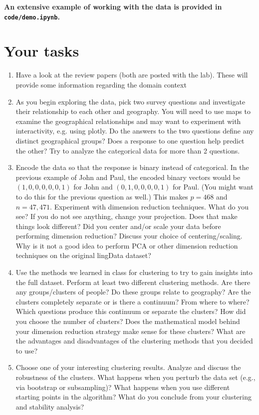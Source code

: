 \documentclass[letterpaper,12pt]{article}
\begin{document}
\textbf{An extensive example of working with the data is provided in \texttt{code/demo.ipynb}.}

\section{Your tasks}

\begin{enumerate}
    \item  Have a look at the review papers \cite{nerbonne2003introducing,nerbonne2006progress} (both are posted with the lab). These will provide some information regarding the domain context
    \item As you begin exploring the data, pick two survey questions and investigate their relationship to each other and geography. You will need to use maps to examine the geographical relationships and may want to experiment with interactivity, e.g. using plotly. Do the answers to the two questions define any distinct geographical groups? Does a response to one question help predict the other? Try to analyze the categorical data for more than 2 questions.
    \item Encode the data so that the response is binary instead of categorical. In the previous example of John and Paul, the encoded binary vectors would be $(1, 0, 0, 0, 0, 0, 1)$ for John and $(0, 1, 0, 0, 0, 0, 1)$ for Paul. (You might want to do this for the previous question as well.) This makes $p = 468$ and $n = 47,471$. Experiment with dimension reduction techniques. What do you see? If you do not see anything, change your projection. Does that make things look different? Did you center and/or scale your data before performing dimension reduction? Discuss your choice of centering/scaling. Why is it not a good idea to perform PCA or other dimension reduction techniques on the original lingData dataset?
    \item Use the methods we learned in class for clustering to try to gain insights into the full dataset. Perform at least two different clustering methods. Are there any groups/clusters of people? Do these groups relate to geography? Are the clusters completely separate or is there a continuum? From where to where? Which questions produce this continuum or separate the clusters? How did you choose the number of clusters? Does the mathematical model behind your dimension reduction strategy make sense for these clusters? What are the advantages and disadvantages of the clustering methods that you decided to use?
    \item Choose one of your interesting clustering results. Analyze and discuss the robustness of the clusters. What happens when you perturb the data set (e.g., via bootstrap or subsampling)? What happens when you use different starting points in the algorithm? What do you conclude from your clustering and stability analysis?

\end{enumerate}
\end{document}
